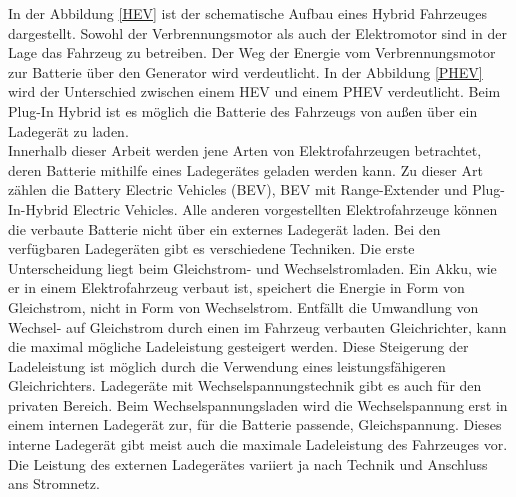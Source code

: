 In der Abbildung \ref{HEV} ist der schematische Aufbau eines Hybrid Fahrzeuges dargestellt. Sowohl der Verbrennungsmotor als auch der Elektromotor sind in der Lage das Fahrzeug zu betreiben. Der Weg der Energie vom Verbrennungsmotor zur Batterie über den Generator wird verdeutlicht. In der Abbildung \ref{PHEV} wird der Unterschied zwischen einem HEV und einem PHEV verdeutlicht. Beim Plug-In Hybrid ist es möglich die Batterie des Fahrzeugs von außen über ein Ladegerät zu laden.\\
Innerhalb dieser Arbeit werden jene Arten von Elektrofahrzeugen betrachtet, deren Batterie mithilfe eines Ladegerätes geladen werden kann. Zu dieser Art zählen die Battery Electric Vehicles (BEV), BEV mit Range-Extender und Plug-In-Hybrid Electric Vehicles. Alle anderen vorgestellten Elektrofahrzeuge können die verbaute Batterie nicht über ein externes Ladegerät laden. Bei den verfügbaren Ladegeräten gibt es verschiedene Techniken. Die erste Unterscheidung liegt beim Gleichstrom- und Wechselstromladen. Ein Akku, wie er in einem Elektrofahrzeug verbaut ist, speichert die Energie in Form von Gleichstrom, nicht in Form von Wechselstrom. Entfällt die Umwandlung von Wechsel- auf Gleichstrom durch einen im Fahrzeug verbauten Gleichrichter, kann die maximal mögliche Ladeleistung gesteigert werden. Diese Steigerung der Ladeleistung ist möglich durch die Verwendung eines leistungsfähigeren Gleichrichters. Ladegeräte mit Wechselspannungstechnik gibt es auch für den privaten Bereich. Beim Wechselspannungsladen wird die Wechselspannung erst in einem internen Ladegerät zur, für die Batterie passende, Gleichspannung. Dieses interne Ladegerät gibt meist auch die maximale Ladeleistung des Fahrzeuges vor. Die Leistung des externen Ladegerätes variiert ja nach Technik und Anschluss ans Stromnetz. \\
